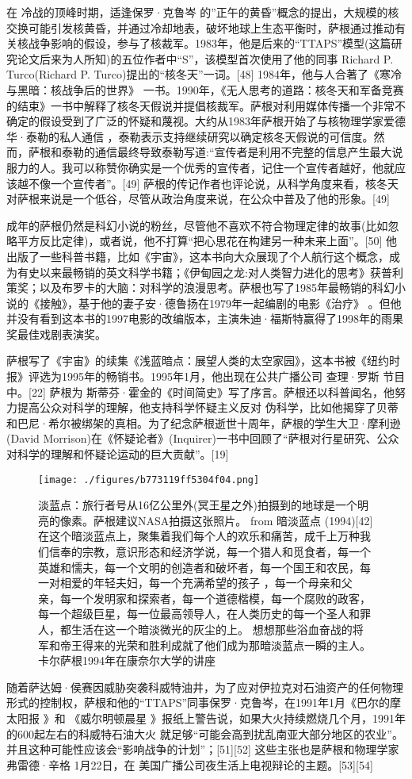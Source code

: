 在 冷战的顶峰时期，适逢保罗·克鲁岑 的”正午的黄昏”概念的提出，大规模的核交换可能引发核黄昏，并通过冷却地表，破坏地球上生态平衡时，萨根通过推动有关核战争影响的假设，参与了核裁军。1983年，他是后来的“TTAPS”模型(这篇研究论文后来为人所知)的五位作者中“S”，该模型首次使用了他的同事 Richard P. Turco(Richard P. Turco)提出的“核冬天”一词。[48] 1984年，他与人合著了《寒冷与黑暗：核战争后的世界》 一书。1990年，《无人思考的道路：核冬天和军备竞赛的结束》一书中解释了核冬天假说并提倡核裁军。萨根对利用媒体传播一个非常不确定的假设受到了广泛的怀疑和蔑视。大约从1983年萨根开始了与核物理学家爱德华·泰勒的私人通信 ，泰勒表示支持继续研究以确定核冬天假说的可信度。然而，萨根和泰勒的通信最终导致泰勒写道:“宣传者是利用不完整的信息产生最大说服力的人。我可以称赞你确实是一个优秀的宣传者，记住一个宣传者越好，他就应该越不像一个宣传者”。[49] 萨根的传记作者也评论说，从科学角度来看，核冬天对萨根来说是一个低谷，尽管从政治角度来说，在公众中普及了他的形象。[49]

成年的萨根仍然是科幻小说的粉丝，尽管他不喜欢不符合物理定律的故事(比如忽略平方反比定律)，或者说，他不打算“把心思花在构建另一种未来上面”。[50] 他出版了一些科普书籍，比如《宇宙》，这本书向大众展现了个人航行这个概念，成为有史以来最畅销的英文科学书籍；《伊甸园之龙:对人类智力进化的思考》获普利策奖；以及布罗卡的大脑：对科学的浪漫思考。萨根也写了1985年最畅销的科幻小说的《接触》，基于他的妻子安·德鲁扬在1979年一起编剧的电影《治疗》 。但他并没有看到这本书的1997电影的改编版本，主演朱迪·福斯特赢得了1998年的雨果奖最佳戏剧表演奖。

萨根写了《宇宙》的续集《浅蓝暗点：展望人类的太空家园》，这本书被《纽约时报》评选为1995年的畅销书。1995年1月，他出现在公共广播公司 查理·罗斯 节目中。[22] 萨根为 斯蒂芬·霍金的《时间简史》写了序言。萨根还以科普闻名，他努力提高公众对科学的理解，他支持科学怀疑主义反对 伪科学，比如他揭穿了贝蒂和巴尼·希尔被绑架的真相。为了纪念萨根逝世十周年，萨根的学生大卫·摩利逊(David Morrison)在《怀疑论者》(Inquirer)一书中回顾了“萨根对行星研究、公众对科学的理解和怀疑论运动的巨大贡献”。[19]
\begin{figure}[ht]
\centering
\texttt{[image: ./figures/b773119ff5304f04.png]}
\caption{淡蓝点：旅行者号从16亿公里外(冥王星之外)拍摄到的地球是一个明亮的像素。萨根建议NASA拍摄这张照片。 from 暗淡蓝点 (1994)[42] 在这个暗淡蓝点上，聚集着我们每个人的欢乐和痛苦，成千上万种我们信奉的宗教，意识形态和经济学说，每一个猎人和觅食者，每一个英雄和懦夫，每一个文明的创造者和破坏者，每一个国王和农民，每一对相爱的年轻夫妇，每一个充满希望的孩子 ，每一个母亲和父亲，每一个发明家和探索者，每一个道德楷模，每一个腐败的政客，每一个超级巨星，每一位最高领导人，在人类历史的每一个圣人和罪人，都生活在这一个暗淡微光的灰尘的上。 想想那些浴血奋战的将军和帝王得来的光荣和胜利成就了他们成为那暗淡蓝点一瞬的主人。 卡尔萨根1994年在康奈尔大学的讲座} \label{fig_Sagan_6}
\end{figure}
随着萨达姆·侯赛因威胁突袭科威特油井，为了应对伊拉克对石油资产的任何物理形式的控制权，萨根和他的“TTAPS”同事保罗·克鲁岑，在1991年1月《巴尔的摩太阳报 》和 《威尔明顿晨星 》报纸上警告说，如果大火持续燃烧几个月，1991年的600起左右的科威特石油大火 就足够“可能会高到扰乱南亚大部分地区的农业”。并且这种可能性应该会“影响战争的计划”；[51][52] 这些主张也是萨根和物理学家弗雷德·辛格 1月22日，在 美国广播公司夜生活上电视辩论的主题。[53][54]

